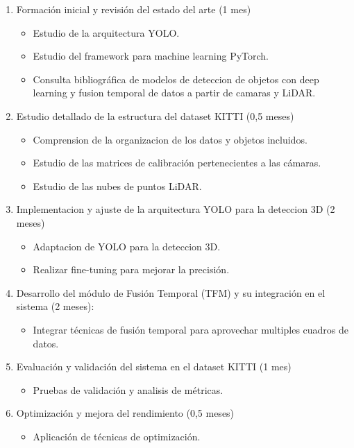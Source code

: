\begin{enumerate}
  
\item Formación inicial y revisión del estado del arte (1 mes)
  \begin{itemize}
  \item Estudio de la arquitectura YOLO.
  \item Estudio del framework para machine learning PyTorch.
  \item Consulta bibliográfica de modelos de deteccion de objetos con deep learning y fusion temporal de datos a partir de camaras y LiDAR. 
  \end{itemize}

\item Estudio detallado de la estructura del dataset KITTI (0,5 meses)
\begin{itemize}
	\item Comprension de la organizacion de los datos y objetos incluidos.
	\item Estudio de las matrices de calibración pertenecientes a las cámaras.
	\item Estudio de las nubes de puntos LiDAR.
\end{itemize}
	

\item Implementacion y ajuste de la arquitectura YOLO para la deteccion 3D (2 meses)
  \begin{itemize}
  \item Adaptacion de YOLO para la deteccion 3D.
  \item Realizar fine-tuning para mejorar la precisión.
  \end{itemize}
  

\item Desarrollo del módulo de Fusión Temporal (TFM) y su integración en el sistema (2 meses):
  \begin{itemize}
  \item Integrar técnicas de fusión temporal para aprovechar multiples cuadros de datos.
  \end{itemize}

\item Evaluación y validación del sistema en el dataset KITTI (1 mes)
	\begin{itemize}
		\item Pruebas de validación y analisis de métricas.
	\end{itemize}

\item Optimización y mejora del rendimiento (0,5 meses)
	\begin{itemize}
		\item Aplicación de técnicas de optimización.
	\end{itemize}


\end{enumerate}
